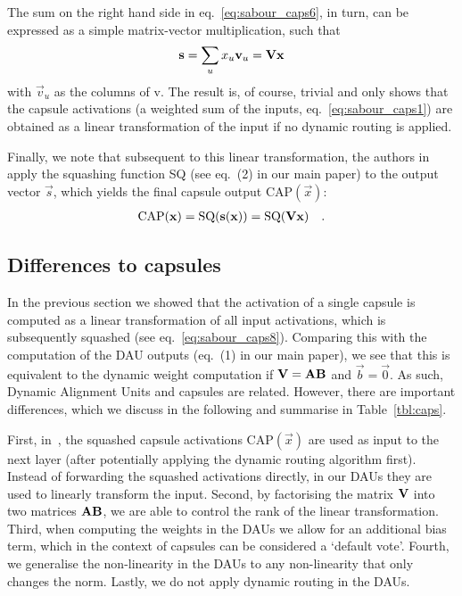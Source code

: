 The sum on the right hand side in eq.~\eqref{eq:sabour_caps6}, in turn, can be expressed as a simple matrix-vector multiplication, such that
\begin{align}
    \vec s = \sum_u x_u\vec v_u = \mat v \vec x
    \label{eq:sabour_caps7}
\end{align}
with $\vec v_u$ as the columns of \tmat v.
The result is, of course, trivial and only shows that the capsule activations (a weighted sum of the inputs, eq.~\eqref{eq:sabour_caps1}) are obtained as a linear transformation of the input if no dynamic routing is applied.

Finally, we note that subsequent to this linear transformation, the authors in~ apply the squashing function SQ (see eq.~(2) in our main paper) to the output vector $\vec s$, which yields the final capsule output $\text{CAP}(\vec x)$:
\begin{align}
    \text{CAP}(\vec x) = \text{SQ}(\vec s(\vec x)) = \text{SQ}(\mat v\vec x)\quad .
    \label{eq:sabour_caps8}
\end{align}
    
\subsection{Differences to capsules}
\label{subsec:capsule_diff_usage}
In the previous section we showed that the activation of a single capsule is computed as a linear transformation of all input activations, which is subsequently squashed (see eq.~\eqref{eq:sabour_caps8}).
Comparing this with the computation of the DAU outputs (eq.~(1) in our main paper), we see that this is equivalent to the dynamic weight computation if $\mat v =\mat{ab}$ and $\vec b=\vec 0$.
As such, Dynamic Alignment Units and capsules are related. However, there are important differences, which we discuss in the following and summarise in Table~\ref{tbl:caps}.

First, in~, the squashed capsule activations $\text{CAP}(\vec x)$
    are used as input to the next layer (after potentially applying the dynamic routing algorithm first).
    Instead of forwarding the squashed activations directly, in our DAUs they are used to linearly transform the input.
Second, by factorising the matrix $\mat v$ into two matrices $\mat{ab}$, we are able to control the rank of the linear transformation. Third,
when computing the weights in the DAUs we allow for an additional bias term, which in the context of capsules can be considered a `default vote'.
Fourth, we generalise the non-linearity in the DAUs to any non-linearity that only changes the norm.
Lastly, we do not apply dynamic routing in the DAUs.